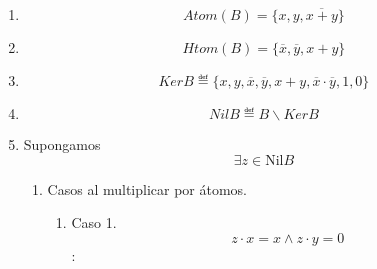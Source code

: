 \begin{enumerate}
\begin{enumerate}
\begin{enumerate}
\begin{enumerate}
        \begin{enumerate}
        \def\labelenumv{\arabic{enumv}.}
        \item
          Supongamos que no:

          \[\exists{z \in \mathit{Atom}}{{(B)} \smallsetminus {\{{x,y}\}}}{z \neq {\overline{x} \cdot \overline{y}}}\]
        \item
          \[{{({x + y})} \cdot z} = 0\]

          \begin{enumerate}
          \def\labelenumvi{\arabic{enumvi}.}
          \tightlist
          \item
            \[{{{({x \cdot z})} + {({y \cdot z})}} = {0 + 0}} = 0\]
          \end{enumerate}
        \item
          \[{\overline{x+y} \cdot z} = 0\]

          \begin{enumerate}
          \def\labelenumvi{\arabic{enumvi}.}
          \tightlist
          \item
            \[\overline{x+y},{z \in \mathit{Atom}}{{{(B)} \land \overline{x+y}} \neq z}\]
          \end{enumerate}
        \item
          \[{z = 0}\mathit{ABSURDO}\]
        \end{enumerate}
      \item
        \[\mathit{Atom}{{(B)} = {\{{x,y,\overline{x+y}}\}}}\]
      \item
        \[\mathit{Htom}{{(B)} = {\{{\overline{x},\overline{y},{x + y}}\}}}\]
      \item
        \[\mathsf{\mathit{Ker}}B ≝ {\{{x,y,\overline{x},\overline{y},{x + y},{\overline{x} \cdot \overline{y}},1,0}\}}\]
      \item
        \[\mathsf{\mathit{Nil}}B ≝ {B \smallsetminus {\mathsf{\mathit{Ker}}B}}\]
      \item
        Supongamos \[\exists{z \in {\mathsf{\mathrm{Nil}}B}}\]

        \begin{enumerate}
        \def\labelenumv{\arabic{enumv}.}
        \item
          Casos al multiplicar por átomos.

          \begin{enumerate}
          \def\labelenumvi{\arabic{enumvi}.}
          \item
            Caso 1. \[{{z \cdot x} = {{x \land z} \cdot y}} = 0\]:


\end{enumerate}
\end{enumerate}
\end{enumerate}
\end{enumerate}
\end{enumerate}
\end{enumerate}
